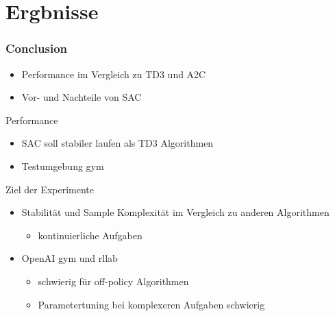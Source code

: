 \section*{Ergbnisse}
\begin{frame}
    \frametitle{Conclusion}
    \begin{itemize}    
        \item Performance im Vergleich zu TD3 und A2C
        \item Vor- und Nachteile von SAC
    \end{itemize}
\end{frame}

\begin{frame}{Performance}
    \begin{itemize}
        \item SAC soll stabiler laufen als TD3 Algorithmen
        \item Testumgebung gym
    \end{itemize}    
\end{frame}


\begin{frame}{Ziel der Experimente}
        \begin{itemize}
            \item Stabilität und Sample Komplexität im Vergleich zu anderen Algorithmen
            \begin{itemize}
                \item kontinuierliche Aufgaben
            \end{itemize}  
            \item OpenAI gym und rllab
            \begin{itemize}
                \item schwierig für off-policy Algorithmen
                \item Parametertuning bei komplexeren Aufgaben schwierig
            \end{itemize}
        \end{itemize}
\end{frame}

